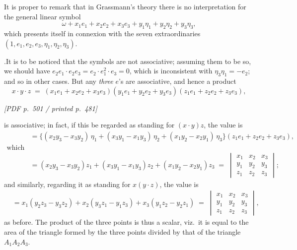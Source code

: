 \documentclass[11pt]{article}
\begin{document}
\medskip

\noindent It is proper to remark that in Grassmann's theory there is no interpretation for the general linear symbol
\[
\omega + x_{1}e_{1} + x_{2}e_{2} + x_{3}e_{3} + y_{1}\eta_{1} + y_{2}\eta_{2} + y_{3}\eta_{3},
\]
which presents itself in connexion with the seven extraordinaries $(1, e_{1}, e_{2}, e_{3}, \eta_{1}, \eta_{2}, \eta_{3})$.

\medskip

.\quad It is to be noticed that the symbols are not associative; assuming them to be so, we should have $e_{2}e_{1}\cdot e_{2}e_{3} = e_{2}\cdot e_{1}^{2}\cdot e_{3} = 0$, which is inconsistent with $\eta_{3}\eta_{1} = -e_{2}$; and so in other cases. But any \textit{three} $e$'s are associative, and hence a product
\[
x\cdot y\cdot z\;=\;(x_{1}e_{1} + x_{2}e_{2} + x_{3}e_{3})(y_{1}e_{1} + y_{2}e_{2} + y_{3}e_{3})(z_{1}e_{1} + z_{2}e_{2} + z_{3}e_{3}),
\]

\vfill
\noindent\textit{[PDF p.~501 / printed p.~481]}
\newpage

\noindent is associative; in fact, if this be regarded as standing for $(x\cdot y)z$, the value is
\begin{align*}
&= \bigl\{(x_{2}y_{3} - x_{3}y_{2})\,\eta_{1} + (x_{3}y_{1} - x_{1}y_{3})\,\eta_{2} + (x_{1}y_{2} - x_{2}y_{1})\,\eta_{3}\bigr\}(z_{1}e_{1} + z_{2}e_{2} + z_{3}e_{3}), \\
\text{which is} \\
&= (x_{2}y_{3} - x_{3}y_{2})z_{1} + (x_{3}y_{1} - x_{1}y_{3})z_{2} + (x_{1}y_{2} - x_{2}y_{1})z_{3}\;=\;\begin{vmatrix} x_{1} & x_{2} & x_{3} \\ y_{1} & y_{2} & y_{3} \\ z_{1} & z_{2} & z_{3} \end{vmatrix};
\end{align*}
and similarly, regarding it as standing for $x(y\cdot z)$, the value is
\begin{align*}
&= x_{1}(y_{2}z_{3} - y_{3}z_{2}) + x_{2}(y_{3}z_{1} - y_{1}z_{3}) + x_{3}(y_{1}z_{2} - y_{2}z_{1})\;=\;\begin{vmatrix} x_{1} & x_{2} & x_{3} \\ y_{1} & y_{2} & y_{3} \\ z_{1} & z_{2} & z_{3} \end{vmatrix},
\end{align*}
as before. The product of the three points is thus a scalar, viz.\ it is equal to the area of the triangle formed by the three points divided by that of the triangle $A_{1}A_{2}A_{3}$.
\end{document}
